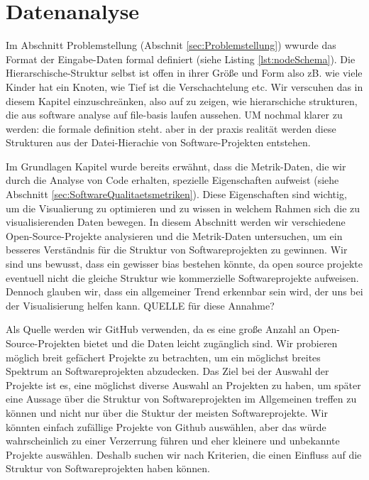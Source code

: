 \section{Datenanalyse} \label{sec:datenAnalyse}

Im Abschnitt Problemstellung (Abschnit \ref{sec:Problemstellung}) wwurde das Format der Eingabe-Daten formal definiert (siehe Listing \ref{lst:nodeSchema}). Die Hierarschische-Struktur selbst ist offen in ihrer Größe und Form also zB. wie viele Kinder hat ein Knoten, wie Tief ist die Verschachtelung etc. Wir verscuhen das in diesem Kapitel einzuschreänken, also auf zu zeigen, wie hierarschiche strukturen, die aus software analyse auf file-basis laufen aussehen. UM nochmal klarer zu werden: die formale definition steht. aber in der praxis realität werden diese Strukturen aus der Datei-Hierachie von Software-Projekten entstehen. 

Im Grundlagen Kapitel wurde bereits erwähnt, dass die Metrik-Daten, die wir durch die Analyse von Code erhalten, spezielle Eigenschaften aufweist (siehe Abschnitt \ref{sec:SoftwareQualitaetsmetriken}). Diese Eigenschaften sind wichtig, um die Visualierung zu optimieren und zu wissen in welchem Rahmen sich die zu visualisierenden Daten bewegen. 
In diesem Abschnitt werden wir verschiedene Open-Source-Projekte analysieren und die Metrik-Daten untersuchen, um ein besseres Verständnis für die Struktur von Softwareprojekten zu gewinnen. 
Wir sind uns bewusst, dass ein gewisser bias bestehen könnte, da open source projekte eventuell nicht die gleiche Struktur wie kommerzielle Softwareprojekte aufweisen. Dennoch glauben wir, dass ein allgemeiner Trend erkennbar sein wird, der uns bei der Visualisierung helfen kann. QUELLE für diese Annahme?

Als Quelle werden wir GitHub verwenden, da es eine große Anzahl an Open-Source-Projekten bietet und die Daten leicht zugänglich sind.
Wir probieren möglich breit gefächert Projekte zu betrachten, um ein möglichst breites Spektrum an Softwareprojekten abzudecken. 
Das Ziel bei der Auswahl der Projekte ist es, eine möglichst diverse Auswahl an Projekten zu haben, um später eine Aussage über die Struktur von Softwareprojekten im Allgemeinen treffen zu können und nicht nur über die Stuktur der meisten Softwareprojekte. Wir könnten einfach zufällige Projekte von Github auswählen, aber das würde wahrscheinlich zu einer Verzerrung führen und eher kleinere und unbekannte Projekte auswählen.
Deshalb suchen wir nach Kriterien, die einen Einfluss auf die Struktur von Softwareprojekten haben können. 

